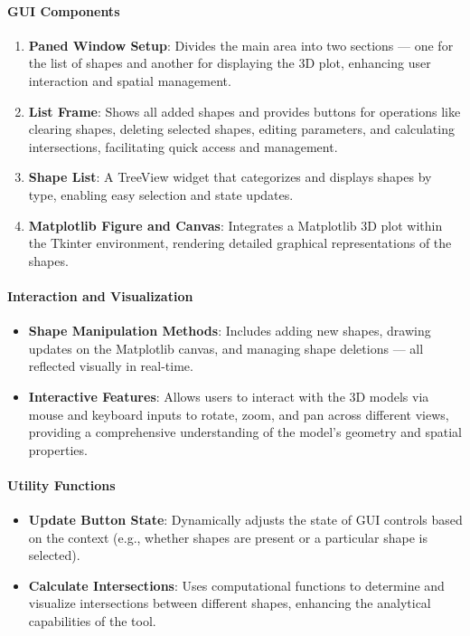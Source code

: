 \documentclass[../main.tex]{subfiles}
\begin{document}
\paragraph{GUI Components}
\begin{enumerate}
    \item \textbf{Paned Window Setup}: Divides the main area into two sections — one for the list of shapes and another for displaying the 3D plot, enhancing user interaction and spatial management.
    \item \textbf{List Frame}: Shows all added shapes and provides buttons for operations like clearing shapes, deleting selected shapes, editing parameters, and calculating intersections, facilitating quick access and management.
    \item \textbf{Shape List}: A TreeView widget that categorizes and displays shapes by type, enabling easy selection and state updates.
    \item \textbf{Matplotlib Figure and Canvas}: Integrates a Matplotlib 3D plot within the Tkinter environment, rendering detailed graphical representations of the shapes.
\end{enumerate}

\paragraph{Interaction and Visualization}
\begin{itemize}
    \item \textbf{Shape Manipulation Methods}: Includes adding new shapes, drawing updates on the Matplotlib canvas, and managing shape deletions — all reflected visually in real-time.
    \item \textbf{Interactive Features}: Allows users to interact with the 3D models via mouse and keyboard inputs to rotate, zoom, and pan across different views, providing a comprehensive understanding of the model's geometry and spatial properties.
\end{itemize}

\paragraph{Utility Functions}
\begin{itemize}
    \item \textbf{Update Button State}: Dynamically adjusts the state of GUI controls based on the context (e.g., whether shapes are present or a particular shape is selected).
    \item \textbf{Calculate Intersections}: Uses computational functions to determine and visualize intersections between different shapes, enhancing the analytical capabilities of the tool.
\end{itemize}
\end{document}
